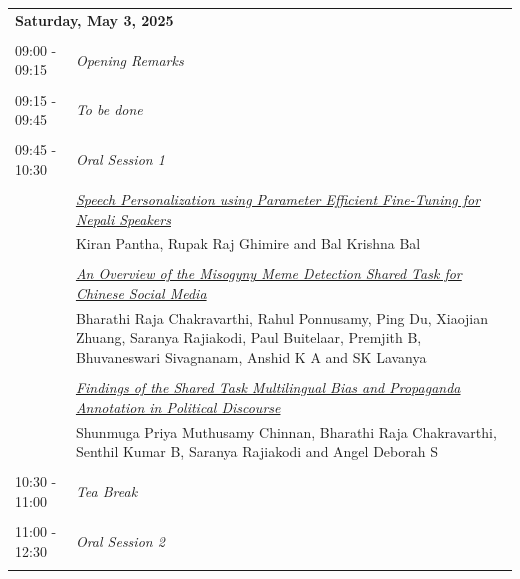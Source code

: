 \documentclass[11pt,oneside]{book}
\begin{document}
        \begin{tabular}{p{24mm}p{124mm}}
    \multicolumn{2}{l}{\bf Saturday, May 3, 2025 } \\\\
                09:00 - 09:15 & \emph{Opening Remarks}\\\\
      
                      09:15 - 09:45 & \emph{To be done}\\\\
      
                      09:45 - 10:30 & \emph{Oral Session 1}\\\\
      
                
                      & \hyperlink{page.189}{\emph{Speech Personalization using Parameter Efficient Fine-Tuning for Nepali Speakers}}\\
        & Kiran Pantha\index{Pantha}, Rupak Raj Ghimire\index{Ghimire} and Bal Krishna Bal\index{Bal}\\\\
                
                      & \hyperlink{page.199}{\emph{An Overview of the Misogyny Meme Detection Shared Task for Chinese Social Media}}\\
        & Bharathi Raja Chakravarthi\index{Chakravarthi}, Rahul Ponnusamy\index{Ponnusamy}, Ping Du\index{Du}, Xiaojian Zhuang\index{Zhuang}, Saranya Rajiakodi\index{Rajiakodi}, Paul Buitelaar\index{Buitelaar}, Premjith B\index{B}, Bhuvaneswari Sivagnanam\index{Sivagnanam}, Anshid K A\index{A} and SK Lavanya\index{Lavanya}\\\\
                
                      & \hyperlink{page.208}{\emph{Findings of the Shared Task Multilingual Bias and Propaganda Annotation in Political Discourse}}\\
        & Shunmuga Priya Muthusamy Chinnan\index{Chinnan}, Bharathi Raja Chakravarthi\index{Chakravarthi}, Senthil Kumar B\index{B}, Saranya Rajiakodi\index{Rajiakodi} and Angel Deborah S\index{S}\\\\
                      10:30 - 11:00 & \emph{Tea Break}\\\\
      
                      11:00 - 12:30 & \emph{Oral Session 2}\\\\
      

\end{tabular}
\end{document}
